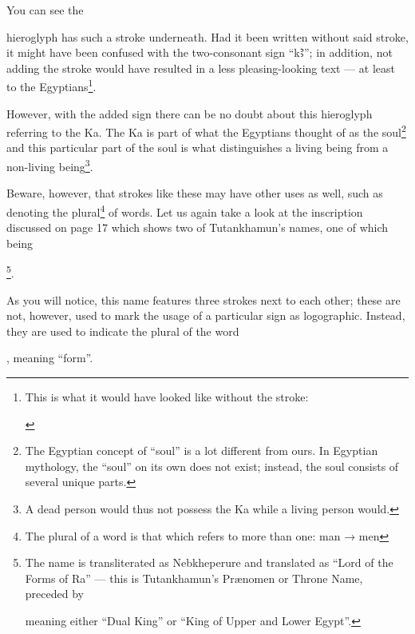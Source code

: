 \documentclass[a5paper,twoside,11pt]{report}
\newcommand{\AHiero}{{\fontspec{DejaVu Sans}Ꜣ}}
\begin{document}
		You can see the \begin{hieroglyph}{\leavevmode {}}\end{hieroglyph} hieroglyph has such a stroke underneath. Had it been written without said stroke, it might have been confused with the two-consonant sign “k\AHiero”; in addition, not adding the stroke would have resulted in a less pleasing-looking text — at least to the Egyptians\footnote{This is what it would have looked like without the stroke: \begin{hieroglyph}{\leavevmode {}\HinterSignsSpace
{}\HinterSignsSpace
{}\HinterSignsSpace
{}}\end{hieroglyph}}.

		However, with the added sign there can be no doubt about this hieroglyph referring to the Ka. The Ka is part of what the Egyptians thought of as the soul\footnote{The Egyptian concept of “soul” is a lot different from ours. In Egyptian mythology, the “soul” on its own does not exist; instead, the soul consists of several unique parts.} and this particular part of the soul is what distinguishes a living being from a non-living being\footnote{A dead person would thus not possess the Ka while a living person would.}.

		Beware, however, that strokes like these may have other uses as well, such as denoting the plural\footnote{The plural of a word is that which refers to more than one: man → men} of words. Let us again take a look at the inscription discussed on page 17 which shows two of Tutankhamun’s names, one of which being \begin{hieroglyph}{\leavevmode {}%
}\end{hieroglyph}\footnote{The name is transliterated as Nebkheperure and translated as “Lord of the Forms of Ra” — this is Tutankhamun’s Prænomen or Throne Name, preceded by \begin{hieroglyph}{\leavevmode {}\HinterSignsSpace
{}}\end{hieroglyph} meaning either “Dual King” or “King of Upper and Lower Egypt”.}.

		As you will notice, this name features three strokes next to each other; these are not, however, used to mark the usage of a particular sign as logographic. Instead, they are used to indicate the plural of the word \begin{hieroglyph}{\leavevmode {}}\end{hieroglyph}, meaning “form”. 
\end{document}
